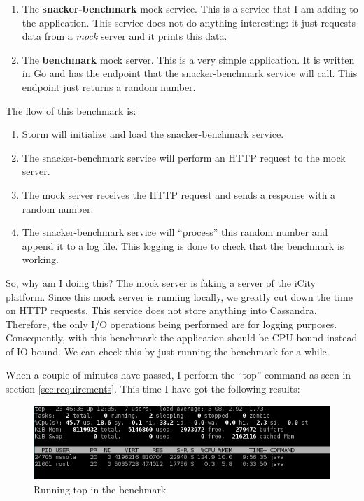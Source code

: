 \begin{enumerate}
  \item The {\bf snacker-benchmark} mock service. This is a service that I am
adding to the application. This service does not do anything interesting: it
just requests data from a {\it mock} server and it prints this data.
  \item The {\bf benchmark} mock server. This is a very simple application. It
is written in Go and has the endpoint that the snacker-benchmark service will
call. This endpoint just returns a random number.
\end{enumerate}

The flow of this benchmark is:

\begin{enumerate}
  \itemsep0em
  \item Storm will initialize and load the snacker-benchmark service.
  \item The snacker-benchmark service will perform an HTTP request to the mock
server.
  \item The mock server receives the HTTP request and sends a response with a
random number.
  \item The snacker-benchmark service will ``process'' this random number and
append it to a log file. This logging is done to check that the benchmark is
working.
\end{enumerate}

So, why am I doing this? The mock server is faking a server of the iCity
platform. Since this mock server is running locally, we greatly cut down
the time on HTTP requests. This service does not store anything into Cassandra.
Therefore, the only I/O operations being performed are for logging purposes.
Consequently, with this benchmark the application should be CPU-bound instead
of IO-bound. We can check this by just running the benchmark for a while.

When a couple of minutes have passed, I perform the ``top'' command as seen in
section \ref{sec:requirements}. This time I have got the following results:

\begin{figure}[H]
  \centering
  \includegraphics[scale=0.9]{hardware/images/total.png}
  \caption{Running top in the benchmark}\label{fig:top_total}
\end{figure}

